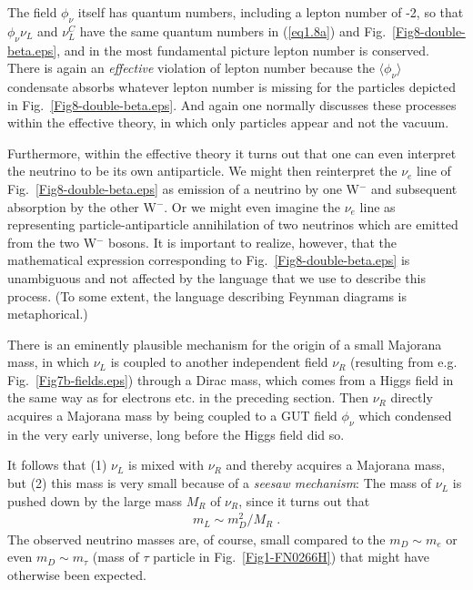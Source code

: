 \documentclass[12pt]{iopart}
\begin{document}
The field $\phi_{\nu} $ itself has quantum numbers, including a lepton number of -2, so that $\phi_{\nu} \nu_L$ and $\nu_L^C$ have the same quantum numbers in (\ref{eq1.8a}) and Fig.~\ref{Fig8-double-beta.eps}, and in the most fundamental picture lepton number is conserved. There is again an \textit{effective} violation of lepton number because the $\langle  \phi_{\nu} \rangle$ condensate absorbs whatever lepton number is missing for the particles depicted in Fig.~\ref{Fig8-double-beta.eps}. And again one normally discusses these processes within the effective theory, in which only particles appear and not the vacuum.

Furthermore, within the effective theory it turns out that one can even interpret the neutrino to be its own antiparticle. We might then reinterpret the $\nu_e$ line of Fig.~\ref{Fig8-double-beta.eps} as emission of a neutrino by one W$^-$ and subsequent absorption by the other W$^-$. Or we might even imagine  the $\nu_e$ line as representing particle-antiparticle annihilation of two neutrinos which are emitted from the two W$^-$ bosons. It is important to realize, however, that the mathematical expression corresponding to Fig.~\ref{Fig8-double-beta.eps} is unambiguous and not affected by the language that we use to describe this process. (To some extent, the language describing Feynman diagrams is metaphorical.)

There is an eminently plausible mechanism for the origin of a small Majorana mass, in which $\nu_L$ is coupled to another independent field $\nu_R$ (resulting from e.g. Fig.~\ref{Fig7b-fields.eps}) through a Dirac mass, which comes from a Higgs field in the same way as for electrons etc. in the preceding section. Then $\nu_R$ directly acquires a Majorana mass by being coupled to a GUT field $\phi_{\nu}$ which condensed in the very early universe, long before the Higgs field did so.

It follows that (1) $\nu_L$ is mixed with $\nu_R$ and thereby acquires a Majorana mass, but (2) this mass is very small because of a \textit{seesaw mechanism}: The mass of $\nu_L$ is pushed down by the large mass $M_R$ of $\nu_R$, since it turns out that 
\begin{eqnarray}
m_L \sim m_D^2/M_R \; .
\label{eq1.9}
\end{eqnarray}
The observed neutrino masses are, of course, small compared to the $m_D \sim m_e$ or even $m_D \sim m_{\tau}$ (mass of $\tau$ particle in Fig.~\ref{Fig1-FN0266H}) that might have otherwise been expected.
\end{document}
